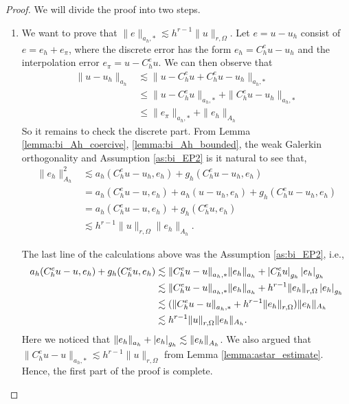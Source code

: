 \begin{proof}
    We will divide the proof into two steps.
    \begin{enumerate}[label=\arabic*)]
        \item We want to prove that $\| e \|_{ a_{h},* }^{  } \lesssim   h^{r-1} \| u \|_{ r,\Omega  }^{  }$.
    Let $e = u - u_{h}$ consist of $e = e_{h} + e_{\pi }$, where the discrete error has the form $e_{h} = C _{h}^{e} u - u_{h}$ and the interpolation error $e_{\pi } = u - C _{h} ^{e}u$. We can then observe that
    \[
        \begin{split}
    \| u - u_{h} \|_{ a_{h} }^{  } & \lesssim  \| u - C_{h}^{e} u + C_{h}^{e}u - u_{h} \|_{ a_{h},* }^{  } \\
    & \le \|  u - C_{h}^{e} u \|_{a_{h},*  }^{  } +  \| C_{h}^{e}u - u_{h} \|_{a_{h},*  }^{  }\\
                                     & \le \| e_{\pi } \|_{a_{h},*}^{  } + \| e_{h} \|_{A_{h}  }^{  }
        \end{split}
    \]
     So it remains to check the discrete part. From Lemma \ref{lemma:bi_Ah_coercive}, \ref{lemma:bi_Ah_bounded}, the weak Galerkin orthogonality and Assumption \ref{as:bi_EP2} is it natural to see that, \[
    \begin{split}
\| e_{h} \|_{ A_{h} }^{ 2 } & \lesssim a_{h}( C _{h}^{e} u - u_{h}, e_{h}) + g_{h}( C _{h}^{e}u - u_{h}, e_{h}) \\
 & = a_{h}( C _{h}^{e} u - u, e_{h}) + a_{h}( u - u_{h}, e_{h}) + g_{h}( C _{h}^{e}u - u_{h}, e_{h}) \\
 & = a_{h}( C _{h}^{e} u - u, e_{h}) + g_{h}( C _{h}^{e}u, e_{h}) \\
 & \lesssim h^{r-1} \| u \|_{ r, \Omega  }^{  } \| e_{h} \|_{ A_{h} }^{  }.
    \end{split}
\]



The last line of the calculations above was the Assumption \ref{as:bi_EP2}, i.e.,
\[
    \begin{split}
        a_{h}( C _{h}^{e} u - u, e_{h}) + g_{h}( C _{h}^{e}u, e_{h}) &\lesssim \| C _{h}^{e} u - u \|_{a_{h},*  }^{  } \| e_{h} \|_{a_{h}  }^{  }
        + \left\lvert  C _{h}^{e}u  \right\rvert_{g_{h}} \left\lvert e_{h}   \right\rvert_{g_{h}} \\
         &\lesssim \| C _{h}^{e} u - u \|_{a_{h},*  }^{  } \| e_{h} \|_{a_{h}  }^{  } + h^{r-1} \| e_{h} \|_{r, \Omega   }^{  }\left\lvert e_{h}   \right\rvert_{g_{h}} \\
         &\lesssim (\| C _{h}^{e} u - u \|_{a_{h},*  }^{  } + h^{r-1} \| e_{h} \|_{r, \Omega   }^{  }) \|e_{h}\|_{A_{h}} \\
         &\lesssim  h^{r-1} \| u \|_{r, \Omega   }^{  } \|e_{h}\|_{A_{h}}.
    \end{split}
\]
Here we noticed that $\| e_{h} \|_{a_{h}  }^{  } + \left\lvert e_{h}   \right\rvert_{g_{h}} \lesssim \| e_{h} \|_{ A_{h} }^{  }  $. We also argued that $\| C _{h}^{e} u - u \|_{a_{h},*  }^{  } \lesssim h^{r-1}\| u \|_{ r,\Omega  }^{  }  $ from Lemma
\ref{lemma:astar_estimate}.
Hence, the first part of the proof is complete.


\end{enumerate}
\end{proof}
